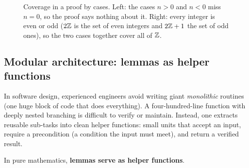 \begin{figure}[htbp]
\caption{Coverage in a proof by cases. Left: the cases $n > 0$ and $n < 0$ miss $n = 0$, so the proof says nothing about it. Right: every integer is even or odd ($2\mathbb{Z}$ is the set of even integers and $2\mathbb{Z} + 1$ the set of odd ones), so the two cases together cover all of $\mathbb{Z}$.}
\label{30:fig-case-coverage}
\end{figure}

\subsection{Modular architecture: lemmas as helper functions}

In software design, experienced engineers avoid writing giant \emph{monolithic} routines (one huge block of code that does everything). A four-hundred-line function with deeply nested branching is difficult to verify or maintain. Instead, one extracts reusable sub-tasks into clean helper functions: small units that accept an input, require a precondition (a condition the input must meet), and return a verified result.

In pure mathematics, \textbf{lemmas serve as helper functions}.

